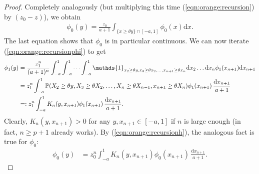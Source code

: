 \documentclass[12pt]{article}
\renewcommand{\P}{\mathbb{P}} %
\newcommand{\1}{\mathds{1}}
\renewcommand{\d}{\mathrm{d}}
\theoremstyle{definition}
\theoremstyle{plain}
\theoremstyle{remark}
\begin{document}
\begin{proof}
Completely analogously (but multiplying this time (\ref{eqn:orange:recursion}) by $(z_0-z)$), we obtain
\begin{align} \label{eqn:orange:recursionh}
\phi_0(y) =\frac{z_0}{a+1}\int_{\{x\geq \theta y\}\cap[-a,1]} \phi_0(x) \d x.
\end{align}
The last equation shows that $\phi_0$ is in particular continuous. 
We can now iterate  (\ref{eqn:orange:recursionphi}) to get
\begin{align} 
\phi_1(y) & = \frac{z_1^n}{(a+1)^n} \int_{-a}^1 \int_{-a}^1 \cdots \int_{-a}^1 \1_{x_2\geq \theta y, x_3\geq \theta x_2, \ldots , x_{n+1} \geq \theta x_n } \d x_2 \ldots \d x_n \phi_1(x_{n+1}) \d x_{n+1}
\notag 
\\
& = z_1^n \int_{-a}^1 \P( X_2 \geq \theta y, X_3\geq \theta X_2, \ldots, X_n\geq \theta X_{n-1}, x_{n+1} \geq \theta X_n) \phi_1(x_{n+1})   \,\frac{\d x_{n+1}}{a+1}
\notag
\\
& =: z_1^n \int_{-a}^1 K_n(y,x_{n+1}) \phi_1(x_{n+1})  \,\frac{\d x_{n+1}}{a+1}.\label{eqn:orange:iteratedphi}
\end{align}
    Clearly,  $K_n(y,x_{n+1})>0$ for any $y,x_{n+1}\in[-a,1]$ if $n$ is large enough (in fact, $n\geq p+1$ already works).
By (\ref{eqn:orange:recursionh}), the analogous fact is true for $\phi_0$:
\begin{align} \label{eqn:orange:iteratedh}
\phi_0(y) & = z_0^n \int_{-a}^1 K_n(y,x_{n+1}) \phi_0(x_{n+1})  \,\frac{\d x_{n+1}}{a+1}.
\end{align}


\end{proof}
\end{document}
